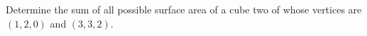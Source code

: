 Determine the sum of all possible surface area of a cube two of whose vertices are $(1,2,0)$ and $(3,3,2)$.
